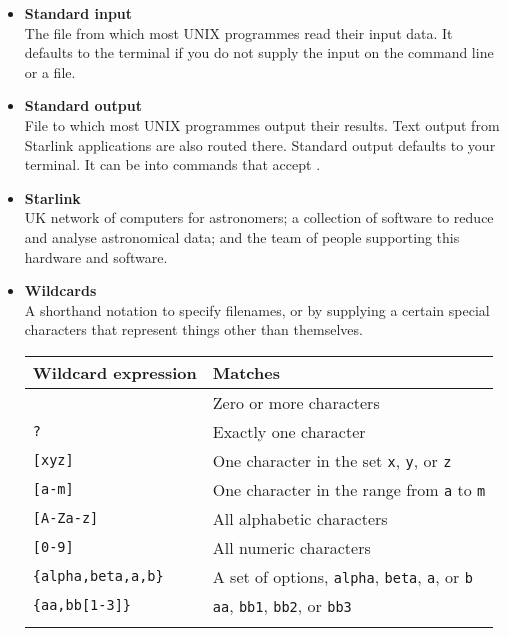 \begin{itemize}
\item {\bf\label{sc4_gl_std_inp}Standard input}\\
      The file from which most UNIX programmes read their input data.
      It defaults to the terminal if you do not supply the input on
      the command line or a file.

\item {\bf\label{sc4_gl_std_out}Standard output}\\
      File to which most UNIX programmes output their results.  Text
      output from Starlink applications are also routed there.
      Standard output defaults to your terminal.  It can be
       into commands that accept
      .

\item {\bf\label{sc4_gl_starlink}Starlink}\\
      UK network of computers for astronomers; a collection of
      software to reduce and analyse astronomical data; and the team
      of people supporting this hardware and software.

\item {\bf\label{sc4_gl_wild}Wildcards}\\
      A shorthand notation to specify filenames,
       or  by supplying a certain special
      characters that represent things other than themselves.
      \medskip


      \begin{tabular}{lp{100mm}}
      Wildcard expression & Matches \\ \hline
      {\tt *} & Zero or more characters \\
      {\tt ?} & Exactly one character \\
      {\tt [xyz]} & One character in the set {\tt x}, {\tt y}, or {\tt z} \\
      {\tt [a-m]} & One character in the range from {\tt a} to {\tt m} \\
      {\tt [A-Za-z]} & All alphabetic characters \\
      {\tt [0-9]} & All numeric characters \\
      {\tt \{alpha,beta,a,b\}} & A set of options, {\tt alpha}, {\tt beta}, {\tt a}, or {\tt b} \\
      {\tt \{aa,bb[1-3]\}} & {\tt aa}, {\tt bb1}, {\tt bb2}, or {\tt bb3} \\
      \\ \hline
      \end{tabular}


\end{itemize}



